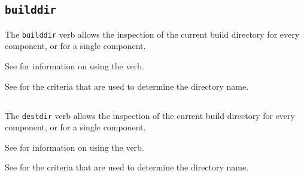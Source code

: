 \subsection{\texttt{builddir}}

The \lmsbw \texttt{builddir} verb allows the inspection of
the current build directory for every component, or for a single
component.

See  for information on using the verb.

See  for the criteria that are used to
determine the directory name.

\subsection{\destdir}
The \lmsbw \texttt{destdir} verb allows the inspection of
the current build directory for every component, or for a single
component.

See  for information on using the verb.

See  for the criteria that are used
to determine the directory name.

